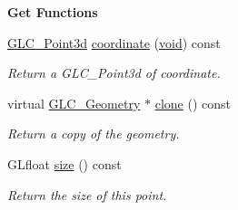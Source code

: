 \begin{Indent}{\bf Get Functions}\par
\begin{DoxyCompactItemize}
\item 
\hyperlink{glc__vector3d_8h_a4e13a9bbc7ab3d34de7e98b41836772c}{G\-L\-C\-\_\-\-Point3d} \hyperlink{class_g_l_c___point_a7758f2ed259cccd7b4ae5b0c12448aef}{coordinate} (\hyperlink{group___u_a_v_objects_plugin_ga444cf2ff3f0ecbe028adce838d373f5c}{void}) const 
\begin{DoxyCompactList}\small\item\em Return a G\-L\-C\-\_\-\-Point3d of coordinate. \end{DoxyCompactList}\item 
virtual \hyperlink{class_g_l_c___geometry}{G\-L\-C\-\_\-\-Geometry} $\ast$ \hyperlink{class_g_l_c___point_ac1dac1b53b2fa260b5ec1e13d47c8a41}{clone} () const 
\begin{DoxyCompactList}\small\item\em Return a copy of the geometry. \end{DoxyCompactList}\item 
G\-Lfloat \hyperlink{class_g_l_c___point_a048a1a782ec9bef5a6ae078cd1a3e9c9}{size} () const 
\begin{DoxyCompactList}\small\item\em Return the size of this point. \end{DoxyCompactList}\end{DoxyCompactItemize}
\end{Indent}
